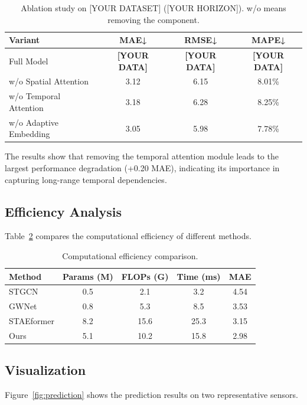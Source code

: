 \documentclass[journal,10pt]{IEEEtran}
\begin{document}
\begin{table}[!t]
\centering
\caption{Ablation study on [YOUR DATASET] ([YOUR HORIZON]).
w/o means removing the component.}
\label{tab:ablation}
\begin{tabular}{lccc}
\toprule
Variant & MAE↓ & RMSE↓ & MAPE↓ \\
\midrule
Full Model & \textbf{[YOUR DATA]} & \textbf{[YOUR DATA]} & \textbf{[YOUR DATA]} \\
w/o Spatial Attention & 3.12 & 6.15 & 8.01\% \\
w/o Temporal Attention & 3.18 & 6.28 & 8.25\% \\
w/o Adaptive Embedding & 3.05 & 5.98 & 7.78\% \\
\bottomrule
\end{tabular}
\end{table}

The results show that removing the temporal attention module leads to the
largest performance degradation (+0.20 MAE), indicating its importance
in capturing long-range temporal dependencies.

\subsection{Efficiency Analysis}
\label{sec:efficiency}

Table~\ref{tab:efficiency} compares the computational efficiency of different methods.

\begin{table}[!t]
\centering
\caption{Computational efficiency comparison.}
\label{tab:efficiency}
\begin{tabular}{lcccc}
\toprule
Method & Params (M) & FLOPs (G) & Time (ms) & MAE \\
\midrule
STGCN & 0.5 & 2.1 & 3.2 & 4.54 \\
GWNet & 0.8 & 5.3 & 8.5 & 3.53 \\
STAEformer & 8.2 & 15.6 & 25.3 & 3.15 \\
\midrule
Ours & 5.1 & 10.2 & 15.8 & 2.98 \\
\bottomrule
\end{tabular}
\end{table}

\subsection{Visualization}
\label{sec:visualization}

Figure~\ref{fig:prediction} shows the prediction results on two representative sensors.
\end{document}
